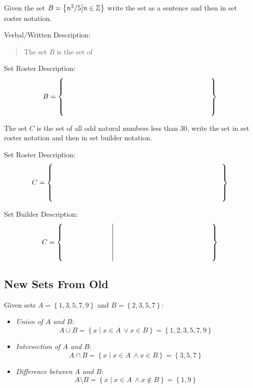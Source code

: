 \begin{practiceprob}
    Given the set \(B=\left\{n^2/5\middle|n\in\mbox{$\mathbb{Z}$}\right\}\) write the set as a sentence and then in set roster notation.

    Verbal/Written Description:
    {\large
    \begin{quote}
        The set \(B\) is the set of 
    \end{quote}
    }
    \vspace{1\baselineskip}

    Set Roster Description:
    {\Large
        \[B=\left\{\phantom{\rule{210pt}{30pt}}\right\}\]
    }
\end{practiceprob}

\begin{practiceprob}
    The set \(C\) is the set of all odd natural numbers less than 30, write the set in set roster notation and then in set builder notation.

    Set Roster Description:
    {\Large
        \[C=\left\{\phantom{\rule{0.7\textwidth}{30pt}}\right\}\]
    }


    Set Builder Description:
    {\Large
        \[C=\left\{\phantom{\rule{70pt}{30pt}}\middle|\phantom{\rule{140pt}{30pt}}\right\}\]
    }
\end{practiceprob}

\clearpage

\subsection{New Sets From Old}
\begin{defn}
    Given sets \(A=\left\{1,3,5,7,9\right\}\) and \(B=\left\{2,3,5,7\right\}\):
    \begin{itemize}
        \item \emph{Union of \(A\) and \(B\)}:
        \begin{equation}\label{eq:union}
            A\cup B=\left\{x\middle|x\in A\ \vee x\in B \right\} = \left\{1,2,3,5,7,9\right\}
        \end{equation}
        \item \emph{Intersection of \(A\) and \(B\)}:
        \begin{equation}\label{eq:intersection}
            A\cap B=\left\{x\middle|x\in A\ \wedge x\in B \right\} = \left\{3,5,7\right\}
        \end{equation}
        \item \emph{Difference between \(A\) and \(B\)}:
        \begin{equation}\label{eq:difference}
            A\setminus B=\left\{x\middle|x\in A\ \wedge x\not\in B \right\} = \left\{1,9\right\}
        \end{equation}
    \end{itemize}
\end{defn}

